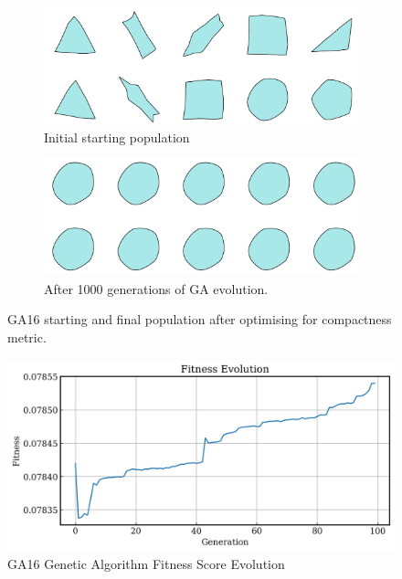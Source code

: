 \documentclass{article}
\begin{document}
\begin{figure}[H]
    \centering
    \begin{subfigure}[b]{0.45\textwidth}
        \centering
        \includegraphics[width=\textwidth]{figures/GAResults/GA16/init_pop10.png}
        \caption{Initial starting population}
        \label{fig:GA16_starting}
    \end{subfigure}
    \hfill
    \begin{subfigure}[b]{0.45\textwidth}
        \centering
        \includegraphics[width=\textwidth]{figures/GAResults/GA16/final_pop10.png}
        \caption{After 1000 generations of GA evolution.}
        \label{fig:GA16_final}
    \end{subfigure}
    \caption{GA16 starting and final population after optimising for compactness metric.}
    \label{fig:GA16_before_after_GA}
\end{figure}

\begin{figure}[H]
    \centering
    \includegraphics[width=0.75\linewidth]{figures/GAResults/GA16/100gen_fitness.png}
    \caption{GA16 Genetic Algorithm Fitness Score Evolution}
    \label{fig:GA16_fitness}
\end{figure}
\end{document}
